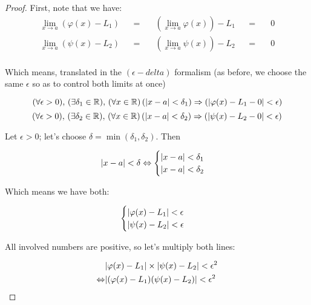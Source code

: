 \documentclass[solutions.tex]{subfiles}
\begin{document}
\begin{proof}
First, note that we have:
\begin{equation*} \begin{aligned}
	\lim_{x\rightarrow a}(\varphi(x)-L_1) &&=\quad&
		(\lim_{x\rightarrow a}\varphi(x))-L_1 &&=\quad& 0 \\
	\lim_{x\rightarrow a}(\psi(x)-L_2) &&=\quad&
		(\lim_{x\rightarrow a}\psi(x))-L_2 &&=\quad& 0 \\
\end{aligned} \end{equation*}

Which means, translated in the $(\epsilon-delta)$ formalism (as
before, we choose the same $\epsilon$ so as to control both limits
at once)

\[ \epsdelta{\epsilon}{\delta_1}{a}{x}{\varphi(x)-L_1}{0}  \]
\[ \epsdelta{\epsilon}{\delta_2}{a}{x}{\psi(x)-L_2}{0}     \]

Let $\epsilon > 0$; let's choose $\delta=\min(\delta_1,\delta_2)$.
Then

\begin{equation*} \begin{aligned}
	\abs{x-a}<\delta \Leftrightarrow \begin{cases}
		\abs{x-a} < \delta_1 \\
		\abs{x-a} < \delta_2
	\end{cases}
\end{aligned} \end{equation*}

Which means we have both:

\begin{equation*} \begin{aligned}
	\begin{cases}
		\abs{\varphi(x)-L_1} < \epsilon \\
		\abs{\psi(x)-L_2} < \epsilon
	\end{cases}
\end{aligned} \end{equation*}

All involved numbers are positive, so let's multiply both lines:

\begin{equation*} \begin{aligned}
	~ & \abs{\varphi(x)-L_1}\times\abs{\psi(x)-L_2} < \epsilon^2 \\
	\Leftrightarrow & \abs{(\varphi(x)-L_1)(\psi(x)-L_2)} < \epsilon^2
\end{aligned} \end{equation*}


\end{proof}
\end{document}
